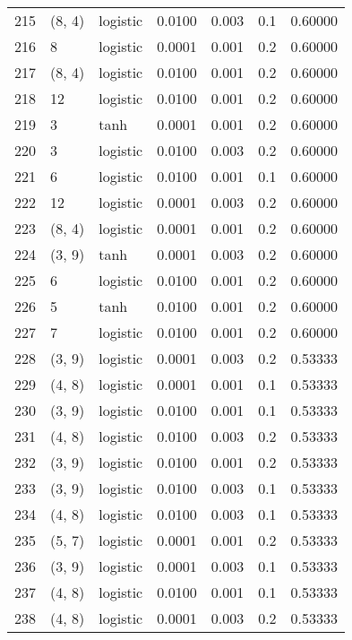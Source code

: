 \begin{tabular}{lllrrrr}
215 &      (8, 4) &  logistic &  0.0100 &  0.003 &  0.1 &   0.60000 \\
216 &           8 &  logistic &  0.0001 &  0.001 &  0.2 &   0.60000 \\
217 &      (8, 4) &  logistic &  0.0100 &  0.001 &  0.2 &   0.60000 \\
218 &          12 &  logistic &  0.0100 &  0.001 &  0.2 &   0.60000 \\
219 &           3 &      tanh &  0.0001 &  0.001 &  0.2 &   0.60000 \\
220 &           3 &  logistic &  0.0100 &  0.003 &  0.2 &   0.60000 \\
221 &           6 &  logistic &  0.0100 &  0.001 &  0.1 &   0.60000 \\
222 &          12 &  logistic &  0.0001 &  0.003 &  0.2 &   0.60000 \\
223 &      (8, 4) &  logistic &  0.0001 &  0.001 &  0.2 &   0.60000 \\
224 &      (3, 9) &      tanh &  0.0001 &  0.003 &  0.2 &   0.60000 \\
225 &           6 &  logistic &  0.0100 &  0.001 &  0.2 &   0.60000 \\
226 &           5 &      tanh &  0.0100 &  0.001 &  0.2 &   0.60000 \\
227 &           7 &  logistic &  0.0100 &  0.001 &  0.2 &   0.60000 \\
228 &      (3, 9) &  logistic &  0.0001 &  0.003 &  0.2 &   0.53333 \\
229 &      (4, 8) &  logistic &  0.0001 &  0.001 &  0.1 &   0.53333 \\
230 &      (3, 9) &  logistic &  0.0100 &  0.001 &  0.1 &   0.53333 \\
231 &      (4, 8) &  logistic &  0.0100 &  0.003 &  0.2 &   0.53333 \\
232 &      (3, 9) &  logistic &  0.0100 &  0.001 &  0.2 &   0.53333 \\
233 &      (3, 9) &  logistic &  0.0100 &  0.003 &  0.1 &   0.53333 \\
234 &      (4, 8) &  logistic &  0.0100 &  0.003 &  0.1 &   0.53333 \\
235 &      (5, 7) &  logistic &  0.0001 &  0.001 &  0.2 &   0.53333 \\
236 &      (3, 9) &  logistic &  0.0001 &  0.003 &  0.1 &   0.53333 \\
237 &      (4, 8) &  logistic &  0.0100 &  0.001 &  0.1 &   0.53333 \\
238 &      (4, 8) &  logistic &  0.0001 &  0.003 &  0.2 &   0.53333 \\

\end{tabular}
